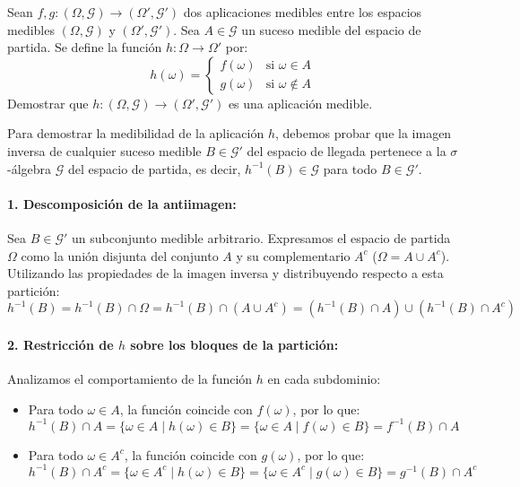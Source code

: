 \newpage
\begin{problema}
Sean $f, g : (\Omega, \mathcal{G}) \to (\Omega', \mathcal{G}')$ dos aplicaciones medibles entre los espacios medibles $(\Omega, \mathcal{G})$ y $(\Omega', \mathcal{G}')$. Sea $A \in \mathcal{G}$ un suceso medible del espacio de partida. Se define la función $h : \Omega \to \Omega'$ por:
\[
    h(\omega) = \begin{cases} f(\omega) & \text{si } \omega \in A \\ g(\omega) & \text{si } \omega \notin A \end{cases}
\]
Demostrar que $h : (\Omega, \mathcal{G}) \to (\Omega', \mathcal{G}')$ es una aplicación medible.

\tcblower

Para demostrar la medibilidad de la aplicación $h$, debemos probar que la imagen inversa de cualquier suceso medible $B \in \mathcal{G}'$ del espacio de llegada pertenece a la $\sigma$-álgebra $\mathcal{G}$ del espacio de partida, es decir, $h^{-1}(B) \in \mathcal{G}$ para todo $B \in \mathcal{G}'$.

\paragraph{1. Descomposición de la antiimagen:}
Sea $B \in \mathcal{G}'$ un subconjunto medible arbitrario. Expresamos el espacio de partida $\Omega$ como la unión disjunta del conjunto $A$ y su complementario $A^c$ ($\Omega = A \cup A^c$). Utilizando las propiedades de la imagen inversa y distribuyendo respecto a esta partición:
\[
    h^{-1}(B) = h^{-1}(B) \cap \Omega = h^{-1}(B) \cap (A \cup A^c) = (h^{-1}(B) \cap A) \cup (h^{-1}(B) \cap A^c)
\]

\paragraph{2. Restricción de $h$ sobre los bloques de la partición:}
Analizamos el comportamiento de la función $h$ en cada subdominio:
\begin{itemize}
    \item Para todo $\omega \in A$, la función coincide con $f(\omega)$, por lo que:
    \[
        h^{-1}(B) \cap A = \{\omega \in A \mid h(\omega) \in B\} = \{\omega \in A \mid f(\omega) \in B\} = f^{-1}(B) \cap A
    \]
    \item Para todo $\omega \in A^c$, la función coincide con $g(\omega)$, por lo que:
    \[
        h^{-1}(B) \cap A^c = \{\omega \in A^c \mid h(\omega) \in B\} = \{\omega \in A^c \mid g(\omega) \in B\} = g^{-1}(B) \cap A^c
    \]
\end{itemize}


\end{problema}
